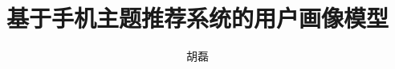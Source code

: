 \documentclass[master,oneside,euler,openright,macfonts]{ustcthesis}
\title{基于手机主题推荐系统的用户画像模型}%
\author{胡磊}
\begin{document}
  \maketitle

\frontmatter
\makeatletter
\ifustc@bachelor
	
	
	\tableofcontents

	\ustclot
	\ustclof
	\ustcloa
	
\else
	\tableofcontents

	\ustclot
	\ustclof
	
\fi
\makeatother

\mainmatter

   
   
   
   
  
  

\backmatter

  


  \makeatletter
  \ifustc@bachelor\relax\else
  \fi
  \makeatother
\end{document}
